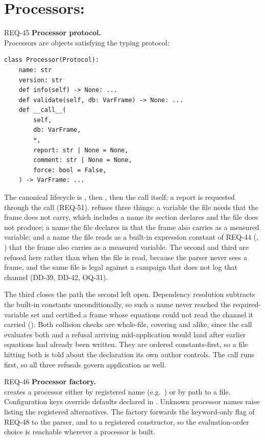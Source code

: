 \section{Processors: }

\begin{reqbox}{REQ-45}{\stable}
\textbf{Processor protocol.}\\
Processors are objects satisfying the  typing protocol:
\begin{lstlisting}
class Processor(Protocol):
    name: str
    version: str
    def info(self) -> None: ...
    def validate(self, db: VarFrame) -> None: ...
    def __call__(
        self,
        db: VarFrame,
        *,
        report: str | None = None,
        comment: str | None = None,
        force: bool = False,
    ) -> VarFrame: ...
\end{lstlisting}
The canonical lifecycle is , then , then
the call itself; a report is requested through the call (REQ-51).
 refuses three things: a variable the file needs that the
frame does not carry, which includes a name its \code{[uncertainties]}
section declares and the file does not produce; a name the file declares
in \code{[constants]} that the frame also carries as a measured
variable; and a name the file reads as a built-in expression constant of
REQ-44 (, ) that the frame also carries as a measured
variable. The second and third are refused here rather than when the
file is read, because the parser never sees a frame, and the same file
is legal against a campaign that does not log that channel (DD-39,
DD-42, OQ-31).

The third closes the path the second left open. Dependency resolution
subtracts the built-in constants unconditionally, so such a name never
reached the required-variable set and  certified a frame
whose equations could not read the channel it carried
(). Both collision checks are whole-file, covering
\code{[equations]} and \code{[corrections]} alike, since the call
evaluates both and a refusal arriving mid-application would land after
earlier equations had already been written. They are ordered
constants-first, so a file hitting both is told about the declaration
its own author controls. The call runs  first, so all
three refusals govern application as well.
\end{reqbox}

\begin{reqbox}{REQ-46}{\stable}
\textbf{Processor factory.}\\
 creates a processor either by
registered name (e.g.\ ) or by path to a
 file. Configuration keys override defaults declared in
\code{[constants]}. Unknown processor names raise
 listing the registered alternatives.
The factory forwards the keyword-only  flag of
REQ-48 to the parser, and to a registered constructor, so the
evaluation-order choice is reachable wherever a processor is built.
\end{reqbox}

